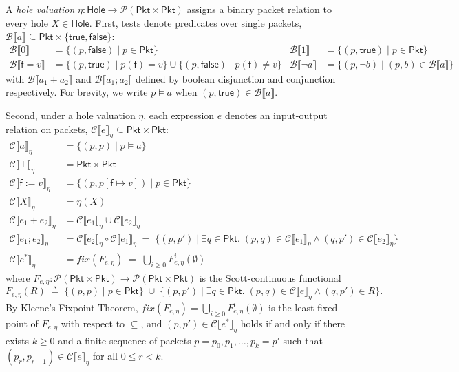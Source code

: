 \documentclass[11pt,a4paper]{article}
\theoremstyle{definition}
\theoremstyle{remark}
\newcommand{\Pkt}{\mathsf{Pkt}}
\newcommand{\Hole}{\mathsf{Hole}}
\newcommand{\Bool}{\{\mathsf{true},\mathsf{false}\}}
\newcommand{\Csem}[1]{\mathcal{C}\llbracket #1 \rrbracket}
\newcommand{\Bsem}[1]{\mathcal{B}\llbracket #1 \rrbracket}
\newcommand{\fix}{\mathit{fix}}
\begin{document}
A \emph{hole valuation} $\eta : \Hole \to \mathcal{P}(\Pkt \times \Pkt)$ assigns a binary packet
relation to every hole $X \in \Hole$. First, tests denote predicates over single packets,
$\Bsem{a} \subseteq \Pkt \times \Bool$:
\begin{align*}
  \Bsem{0} &= \{(p, \mathsf{false}) \mid p \in \Pkt\} &
  \Bsem{1} &= \{(p, \mathsf{true}) \mid p \in \Pkt\} \\
  \Bsem{\mathsf{f} = v} &= \{(p, \mathsf{true}) \mid p(\mathsf{f}) = v\}
    \cup \{(p, \mathsf{false}) \mid p(\mathsf{f}) \neq v\} &
  \Bsem{\neg a} &= \{(p, \neg b) \mid (p, b) \in \Bsem{a}\}
\end{align*}
with $\Bsem{a_1 + a_2}$ and $\Bsem{a_1 ; a_2}$ defined by boolean disjunction and conjunction
respectively. For brevity, we write $p \models a$ when $(p, \mathsf{true}) \in \Bsem{a}$.

Second, under a hole valuation $\eta$, each expression $e$ denotes an input-output relation on
packets, $\Csem{e}_\eta \subseteq \Pkt \times \Pkt$:
\begin{align*}
  \Csem{a}_\eta &= \{(p, p) \mid p \models a\} \\
  \Csem{\top}_\eta &= \Pkt \times \Pkt \\
  \Csem{\mathsf{f} := v}_\eta &= \{(p, p[\mathsf{f} \mapsto v]) \mid p \in \Pkt\} \\
  \Csem{X}_\eta &= \eta(X) \\
  \Csem{e_1 + e_2}_\eta &= \Csem{e_1}_\eta \cup \Csem{e_2}_\eta \\
  \Csem{e_1 ; e_2}_\eta &= \Csem{e_2}_\eta \circ \Csem{e_1}_\eta
    \;=\; \{(p, p') \mid \exists q \in \Pkt.\; (p, q) \in \Csem{e_1}_\eta \land (q, p') \in \Csem{e_2}_\eta\} \\
  \Csem{e^*}_\eta &= \fix(F_{e,\eta}) \;=\; \bigcup_{i \ge 0} F_{e,\eta}^i(\emptyset)
\end{align*}
where $F_{e,\eta} : \mathcal{P}(\Pkt \times \Pkt) \to \mathcal{P}(\Pkt \times \Pkt)$ is the
Scott-continuous functional
\[
  F_{e,\eta}(R) \;\triangleq\; \{(p, p) \mid p \in \Pkt\} \;\cup\;
  \{(p, p') \mid \exists q \in \Pkt.\; (p, q) \in \Csem{e}_\eta \land (q, p') \in R\}.
\]
By Kleene's Fixpoint Theorem, $\fix(F_{e,\eta}) = \bigcup_{i \ge 0} F_{e,\eta}^i(\emptyset)$ is
the least fixed point of $F_{e,\eta}$ with respect to $\subseteq$, and $(p, p') \in \Csem{e^*}_\eta$
holds if and only if there exists $k \ge 0$ and a finite sequence of packets
$p = p_0, p_1, \dots, p_k = p'$ such that $(p_r, p_{r+1}) \in \Csem{e}_\eta$ for all $0 \le r < k$.
\end{document}
